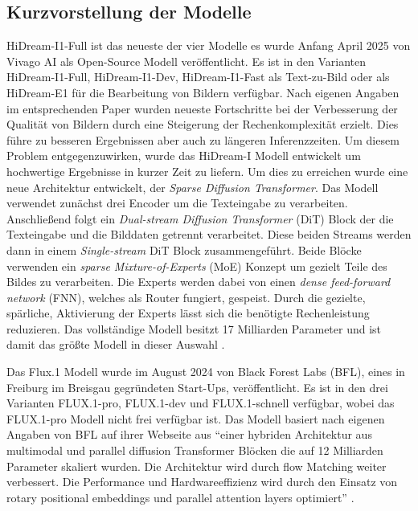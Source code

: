 \subsection{Kurzvorstellung der Modelle}
HiDream-I1-Full ist das neueste der vier Modelle es wurde Anfang April 2025 von Vivago AI als Open-Source Modell veröffentlicht. Es ist in den Varianten HiDream-I1-Full, HiDream-I1-Dev, HiDream-I1-Fast als Text-zu-Bild oder als HiDream-E1 für die Bearbeitung von Bildern verfügbar. Nach eigenen Angaben im entsprechenden Paper \cite[Abstract]{cai2025hidreami1highefficientimagegenerative} wurden neueste Fortschritte bei der Verbesserung der Qualität von Bildern durch eine Steigerung der Rechenkomplexität erzielt. Dies führe zu besseren Ergebnissen aber auch zu längeren Inferenzzeiten. Um diesem Problem entgegenzuwirken, wurde das HiDream-I Modell entwickelt um hochwertige Ergebnisse in kurzer Zeit zu liefern.
Um dies zu erreichen wurde eine neue Architektur entwickelt, der \emph{Sparse Diffusion Transformer}. Das Modell verwendet zunächst drei Encoder um die Texteingabe zu verarbeiten. Anschließend folgt ein \emph{Dual-stream Diffusion Transformer} (DiT) Block der die Texteingabe und die Bilddaten getrennt verarbeitet. Diese beiden Streams werden dann in einem \emph{Single-stream} DiT Block zusammengeführt. 
Beide Blöcke verwenden ein \emph{sparse Mixture-of-Experts} (MoE) Konzept um gezielt Teile des Bildes zu verarbeiten. Die Experts werden dabei von einen \emph{dense feed-forward network} (FNN), welches als Router fungiert, gespeist. Durch die gezielte, spärliche, Aktivierung der Experts lässt sich die benötigte Rechenleistung reduzieren.
Das vollständige Modell besitzt 17 Milliarden Parameter und ist damit das größte Modell in dieser Auswahl \cite[S.~7-9]{cai2025hidreami1highefficientimagegenerative}.

Das Flux.1 Modell wurde im August 2024 von Black Forest Labs (BFL), eines in Freiburg im Breisgau gegründeten Start-Ups, veröffentlicht. Es ist in den drei Varianten FLUX.1-pro, FLUX.1-dev und FLUX.1-schnell verfügbar, wobei das FLUX.1-pro Modell nicht frei verfügbar ist. 
Das Modell basiert nach eigenen Angaben von BFL auf ihrer Webseite aus ``einer hybriden Architektur aus multimodal und parallel diffusion Transformer Blöcken die auf 12 Milliarden Parameter skaliert wurden. Die Architektur wird durch flow Matching weiter verbessert. Die Performance und Hardwareeffizienz wird durch den Einsatz von rotary positional embeddings und parallel attention layers optimiert'' \cite{bfl-flux-announcement}.

